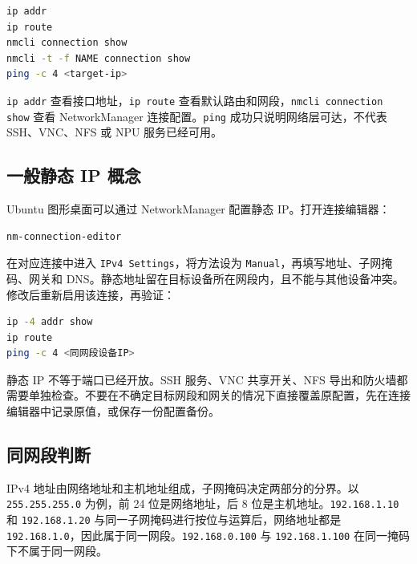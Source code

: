 \begin{lstlisting}[language=bash]
ip addr
ip route
nmcli connection show
nmcli -t -f NAME connection show
ping -c 4 <target-ip>
\end{lstlisting}

\passthrough{\lstinline!ip addr!}
查看接口地址，\passthrough{\lstinline!ip route!}
查看默认路由和网段，\passthrough{\lstinline!nmcli connection show!} 查看
NetworkManager 连接配置。\passthrough{\lstinline!ping!}
成功只说明网络层可达，不代表 SSH、VNC、NFS 或 NPU 服务已经可用。

\subsection{一般静态 IP
概念}\label{ux4e00ux822cux9759ux6001-ip-ux6982ux5ff5}

Ubuntu 图形桌面可以通过 NetworkManager 配置静态 IP。打开连接编辑器：

\begin{lstlisting}[language=bash]
nm-connection-editor
\end{lstlisting}

在对应连接中进入 \passthrough{\lstinline!IPv4 Settings!}，将方法设为
\passthrough{\lstinline!Manual!}，再填写地址、子网掩码、网关和
DNS。静态地址留在目标设备所在网段内，且不能与其他设备冲突。修改后重新启用该连接，再验证：

\begin{lstlisting}[language=bash]
ip -4 addr show
ip route
ping -c 4 <同网段设备IP>
\end{lstlisting}

静态 IP 不等于端口已经开放。SSH 服务、VNC 共享开关、NFS
导出和防火墙都需要单独检查。不要在不确定目标网段和网关的情况下直接覆盖原配置，先在连接编辑器中记录原值，或保存一份配置备份。

\subsection{同网段判断}\label{ux540cux7f51ux6bb5ux5224ux65ad}

IPv4 地址由网络地址和主机地址组成，子网掩码决定两部分的分界。以
\passthrough{\lstinline!255.255.255.0!} 为例，前 24 位是网络地址，后 8
位是主机地址。\passthrough{\lstinline!192.168.1.10!} 和
\passthrough{\lstinline!192.168.1.20!}
与同一子网掩码进行按位与运算后，网络地址都是
\passthrough{\lstinline!192.168.1.0!}，因此属于同一网段。\passthrough{\lstinline!192.168.0.100!}
与 \passthrough{\lstinline!192.168.1.100!} 在同一掩码下不属于同一网段。

